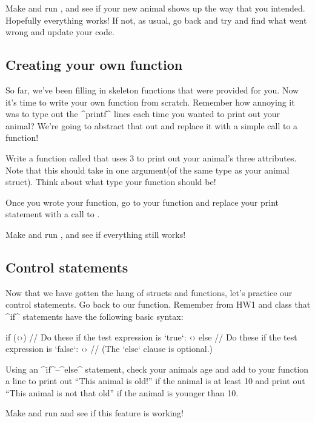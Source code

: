 \documentclass{tufte-handout}
\begin{document}
Make and run , and see if your new animal shows up the way that
you intended.  Hopefully everything works!  If not, as usual, go back
and try and find what went wrong and update your code. 


\subsection{Creating your own function}

So far, we've been filling in skeleton functions that were provided for
you. Now it's time to write your own function from scratch.  Remember
how annoying it was to type out the ^printf^ lines each
time you wanted to print out your animal?  We're going to abstract that
out and replace it with a simple call to a function! 

Write a function called  that uses
3 to print out your animal's three attributes.
Note that this should take in one argument(of the same type as your
animal struct).  Think about what type your function should
be!

Once you wrote your function, go to your  function
and replace your print statement with a call to
.

Make and run , and see if everything still works!  

\subsection{Control statements}

Now that we have gotten the hang of structs and functions, let's
practice our control statements.  Go back to our
 function.  Remember from HW1 and class that
^if^ statements have the following basic syntax:

\begin{Code}
    if (‹›) {
        // Do these if the test expression is `true`:
        ‹›
    } else {
        // Do these if the test expression is `false`:
        ‹›
        // (The `else` clause is optional.)
    }
\end{Code}

Using an ^if^--^else^ statement, check your animals age and add to your
 function a line to print out ``This animal is
old!'' if the animal is at least 10 and print out ``This animal is not
that old'' if the animal is younger than 10.   

Make and run  and see if this feature is working!
\end{document}
